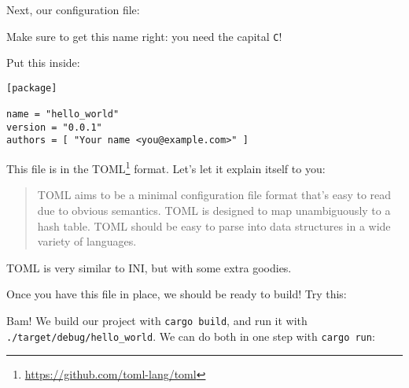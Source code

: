 \documentclass[a4paper,]{book}
\newenvironment{Shaded}{\begin{snugshade}}{\end{snugshade}}
\newcommand{\KeywordTok}[1]{\textcolor[rgb]{0.13,0.29,0.53}{\textbf{{#1}}}}
\newcommand{\NormalTok}[1]{{#1}}
\renewcommand{\href}[2]{#2\footnote{\url{#1}}}
\begin{document}
Next, our configuration file:

\begin{Shaded}
\end{Shaded}

Make sure to get this name right: you need the capital \texttt{C}!

Put this inside:

\begin{verbatim}
[package]

name = "hello_world"
version = "0.0.1"
authors = [ "Your name <you@example.com>" ]
\end{verbatim}

This file is in the \href{https://github.com/toml-lang/toml}{TOML}
format. Let's let it explain itself to you:

\begin{quote}
TOML aims to be a minimal configuration file format that's easy to read
due to obvious semantics. TOML is designed to map unambiguously to a
hash table. TOML should be easy to parse into data structures in a wide
variety of languages.
\end{quote}

TOML is very similar to INI, but with some extra goodies.

Once you have this file in place, we should be ready to build! Try this:

\begin{Shaded}
\end{Shaded}

Bam! We build our project with \texttt{cargo\ build}, and run it with
\texttt{./target/debug/hello\_world}. We can do both in one step with
\texttt{cargo\ run}:

\begin{Shaded}
\end{Shaded}
\end{document}
